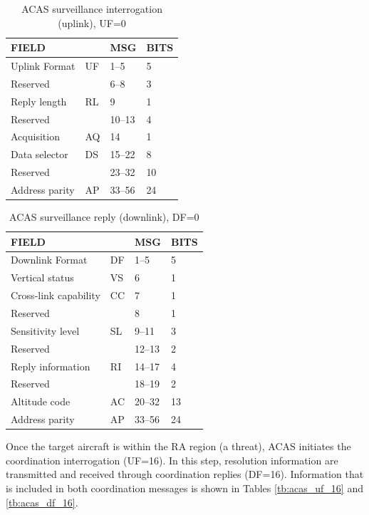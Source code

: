 \begin{table}[ht]
  \centering
  \caption{ACAS surveillance interrogation (uplink), UF=0}
  \label{tb:acas_uf_0}
  \begin{tabular}[t]{|l|l|l|l|}
  \hline
  \textbf{FIELD} & \textbf{} & \textbf{MSG} & \textbf{BITS} \\ \hline
  Uplink Format & UF & 1--5 & 5 \\ \hline
  Reserved &  & 6--8 & 3 \\ \hline
  Reply length & RL & 9 & 1 \\ \hline
  Reserved &  & 10--13 & 4 \\ \hline
  Acquisition & AQ & 14 & 1 \\ \hline
  Data selector & DS & 15--22 & 8 \\ \hline
  Reserved &  & 23--32 & 10 \\ \hline
  Address parity & AP & 33--56 & 24 \\ \hline
  \end{tabular}
\end{table}


\begin{table}[ht]
  \centering
  \caption{ACAS surveillance reply (downlink), DF=0}
  \label{tb:acas_df_0}
  \begin{tabular}[t]{|l|l|l|l|}
  \hline
  \textbf{FIELD} & \textbf{} & \textbf{MSG} & \textbf{BITS} \\ \hline
  Downlink Format & DF & 1--5 & 5 \\ \hline
  Vertical status & VS & 6 & 1 \\ \hline
  Cross-link capability & CC & 7 & 1 \\ \hline
  Reserved &  & 8 & 1 \\ \hline
  Sensitivity level & SL & 9--11 & 3 \\ \hline
  Reserved &  & 12--13 & 2 \\ \hline
  Reply information & RI & 14--17 & 4 \\ \hline
  Reserved &  & 18--19 & 2 \\ \hline
  Altitude code & AC & 20--32 & 13 \\ \hline
  Address parity & AP & 33--56 & 24 \\ \hline
  \end{tabular}
\end{table}


Once the target aircraft is within the RA region (a threat), ACAS initiates the coordination interrogation (UF=16). In this step, resolution information are transmitted and received through coordination replies (DF=16). Information that is included in both coordination messages is shown in Tables \ref{tb:acas_uf_16} and \ref{tb:acas_df_16}.


